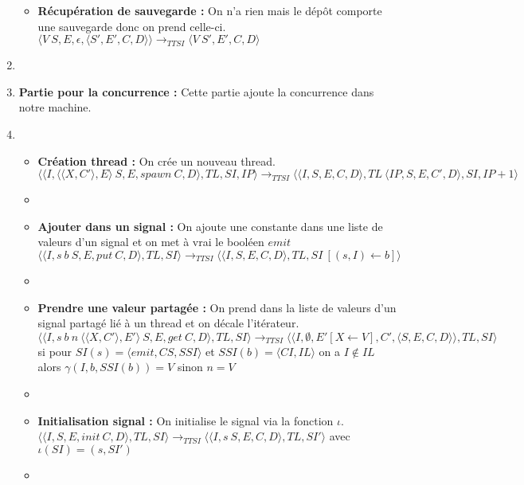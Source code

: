 \documentclass[10pt,a4paper]{report}
\begin{document}
\begin{enumerate}
\begin{itemize}
			\item[] \textbf{Récupération de sauvegarde :}  On n'a rien mais le dépôt comporte une sauvegarde donc on prend celle-ci.
			\smallbreak  
			$\langle V~S,E,\epsilon,\langle S',E',C,D\rangle\rangle
			\longrightarrow_{TTSI} 
			\langle V~S',E',C,D\rangle$
		\end{itemize}
		\item[]
		
		
		
		\item[] \textbf{Partie pour la concurrence :} Cette partie ajoute la concurrence dans notre machine. 
		\item[]
		\begin{itemize}
			\item[]  \textbf{Création thread :} On crée un nouveau thread.
			\smallbreak 
			$\langle\langle I,\langle\langle X,C'\rangle, E\rangle~S,E,spawn~C,D\rangle,TL,SI,IP\rangle 
			\longrightarrow_{TTSI} 
			\langle\langle I,S,E,C,D\rangle,TL~\langle IP,S,E,C',D\rangle,SI,IP+1\rangle$
			\item[]
			
			\item[] \textbf{Ajouter dans un signal :} On ajoute une constante dans une liste de valeurs d'un signal et on met à vrai le booléen $emit$
			\smallbreak
			$\langle\langle I,s~b~S,E,put~C,D\rangle,TL,SI\rangle
			\longrightarrow_{TTSI} 
			\langle\langle I,S,E,C,D\rangle,TL,SI~[(s,I) \leftarrow b]\rangle$ 
			\item[]
			
			\item[] \textbf{Prendre une valeur partagée :} On prend dans la liste de valeurs d'un signal partagé lié à un thread et on décale l'itérateur.
			\smallbreak
			$\langle\langle I,s~b~n~\langle\langle X,C'\rangle,E'\rangle~S,E,get~C,D\rangle,TL,SI\rangle 
			\longrightarrow_{TTSI} 
			\langle\langle I,\emptyset,E'[X \leftarrow V],C',\langle S,E,C,D\rangle\rangle,TL,SI\rangle$
			\\ si pour $SI(s) = \langle emit,CS,SSI\rangle$ et $SSI(b) = \langle CI,IL\rangle$ on a $I \notin IL$ alors $\gamma(I,b,SSI(b)) = V$ sinon $n = V$
			\item[]
			
			\item[] \textbf{Initialisation signal :} On initialise le signal via la fonction $\iota$.
			\smallbreak 
			$\langle\langle I,S,E,init~C,D\rangle,TL,SI\rangle 
			\longrightarrow_{TTSI}
			\langle\langle I,s~S,E,C,D\rangle,TL,SI'\rangle$
			avec $\iota(SI) = (s,SI')$
			\item[]	
			

\end{itemize}
\end{enumerate}
\end{document}
